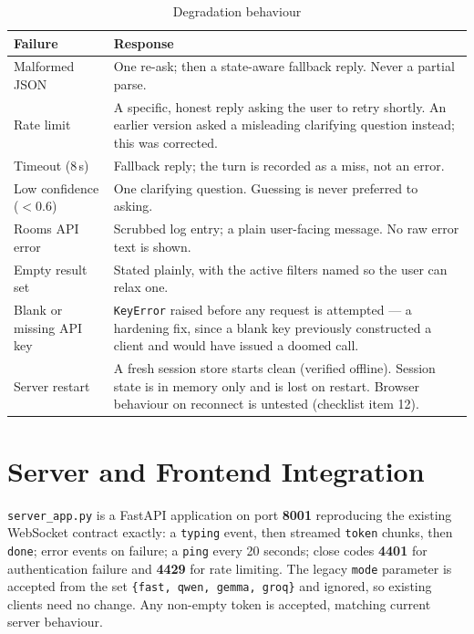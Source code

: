 \documentclass[11pt,a4paper]{article}
\newcommand{\fn}[1]{\texttt{\small #1}}
\begin{document}
\begin{table}[H]
\centering
\caption{Degradation behaviour}
\small
\begin{tabularx}{\textwidth}{@{}l>{\raggedright\arraybackslash}X@{}}
\toprule
\textbf{Failure} & \textbf{Response}\\
\midrule
Malformed JSON & One re-ask; then a state-aware fallback reply. Never a partial parse.\\
Rate limit & A specific, honest reply asking the user to retry shortly. An earlier version
asked a misleading clarifying question instead; this was corrected.\\
Timeout (8\,s) & Fallback reply; the turn is recorded as a miss, not an error.\\
Low confidence ($<0.6$) & One clarifying question. Guessing is never preferred to asking.\\
Rooms API error & Scrubbed log entry; a plain user-facing message. No raw error text is shown.\\
Empty result set & Stated plainly, with the active filters named so the user can relax one.\\
Blank or missing API key & \fn{KeyError} raised before any request is attempted --- a hardening
fix, since a blank key previously constructed a client and would have issued a doomed call.\\
Server restart & A fresh session store starts clean (verified offline). Session state is
in memory only and is lost on restart. Browser behaviour on reconnect is untested
(checklist item 12).\\
\bottomrule
\end{tabularx}
\end{table}

\section{Server and Frontend Integration}

\fn{server\_app.py} is a FastAPI application on port \textbf{8001} reproducing the existing
WebSocket contract exactly: a \fn{typing} event, then streamed \fn{token} chunks, then
\fn{done}; error events on failure; a \fn{ping} every 20 seconds; close codes \textbf{4401}
for authentication failure and \textbf{4429} for rate limiting. The legacy \fn{mode} parameter
is accepted from the set \fn{\{fast, qwen, gemma, groq\}} and ignored, so existing clients
need no change. Any non-empty token is accepted, matching current server behaviour.
\end{document}
